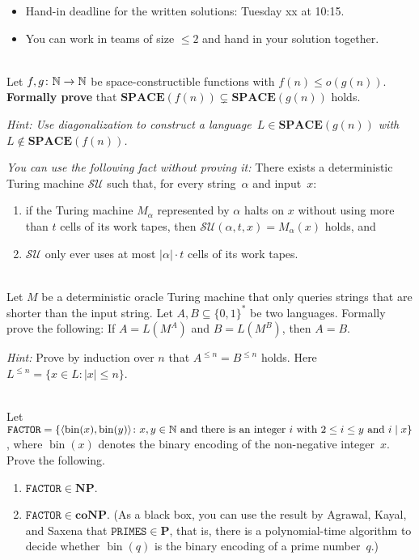 \documentclass[english]{uebung_cs}
\begin{document}
\begin{itemize}
  \item Hand-in deadline for the written solutions: Tuesday xx at 10:15.
  \item You can work in teams of size $\le 2$ and hand in your solution together.
\end{itemize}

\begin{aufgabe}[Diagonalization]\mbox{}\\
    Let $f,g\colon\mathbb{N}\to\mathbb{N}$ be space-constructible functions with $f(n)\le o(g(n))$.
    \textbf{Formally prove} that $\mathbf{SPACE}(f(n))\subsetneq\mathbf{SPACE}(g(n))$ holds.

    \textit{Hint: Use diagonalization to construct a language~$L\in\mathbf{SPACE}(g(n))$ with $L\not\in\mathbf{SPACE}(f(n))$.}

    \textit{You can use the following fact without proving it:}
    There exists a deterministic Turing machine $\mathcal{SU}$ such that, for every string~$\alpha$ and input~$x$:
    \begin{enumerate}
      \item if the Turing machine $M_\alpha$ represented by $\alpha$ halts on $x$ without using more than $t$ cells of its work tapes, then $\mathcal{SU}(\alpha,t,x)=M_\alpha(x)$ holds, and
      \item $\mathcal{SU}$ only ever uses at most $|\alpha|\cdot t$ cells of its work tapes.
    \end{enumerate}
\end{aufgabe}

\begin{aufgabe}[Oracles]\mbox{}\\
  Let $M$ be a deterministic oracle Turing machine that only queries strings 
  that are shorter than the input string.
  Let $A,B\subseteq\{0,1\}^\ast$ be two languages.
  Formally prove the following: If $A = L(M^A)$ and $B = L(M^B)$, then $A = B$.
  
  \emph{Hint:} Prove by induction over $n$ that $A^{\le n} = B^{\le n}$ holds. Here $L^{\le n}=\{x\in L\colon |x|\le n\}$.
\end{aufgabe}

\begin{aufgabe}\mbox{}\\
  Let $\mathtt{FACTOR}=\{\langle\operatorname{bin}(x),\operatorname{bin}(y)\rangle\colon \text{$x,y\in\mathbb{N}$ and there is an integer $i$ with $2\le i \le y$ and $i \mathrel{|} x$}\}$,
  where $\operatorname{bin}(x)$ denotes the binary encoding of the non-negative integer~$x$.
  Prove the following.
  \begin{enumerate}
    \item $\mathtt{FACTOR}\in\mathbf{NP}$.
    \item $\mathtt{FACTOR}\in\mathbf{coNP}$. (As a black box, you can use the result by Agrawal, Kayal, and Saxena that $\mathtt{PRIMES}\in\mathbf{P}$, that is, there is a polynomial-time algorithm to decide whether $\operatorname{bin}(q)$ is the binary encoding of a prime number~$q$.)
  \end{enumerate}
\end{aufgabe}
\end{document}
